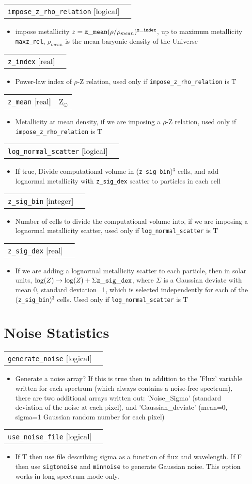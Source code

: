 \documentclass{report}
\makeatletter
\newcommand{\paramdefinition}[3]{
\begin{tabular*}{\textwidth}{l@{\extracolsep{\fill}}r}
		{\tt #1} [{\sc #2}]& #3 \\
\end{tabular*}}
\newcommand{\paramdescription}[1]{
\begin{itemize}
\item #1
\end{itemize}\vspace{0.2cm}}
\makeatother
\begin{document}
\paramdefinition{impose\_z\_rho\_relation}{logical}{ }
\paramdescription{ impose metallicity $z = {\tt z\_mean} (\rho/\rho_{mean})^{{\tt z\_index}}$, up to maximum metallicity {\tt maxz\_rel}, $\rho_{mean}$ is the mean baryonic density of the Universe}

\paramdefinition{z\_index}{real}{ }
\paramdescription{Power-law index of $\rho$-Z relation, used only if {\tt impose\_z\_rho\_relation} is T}

\paramdefinition{z\_mean}{real}{Z$_{\odot}$}
\paramdescription{Metallicity at mean density, if we are imposing a $\rho$-Z relation, used only if {\tt impose\_z\_rho\_relation} is T}

\paramdefinition{log\_normal\_scatter}{logical}{ }
\paramdescription{If true, Divide computational volume in ({\tt z\_sig\_bin})$^3$ cells, and add lognormal metallicity with {\tt z\_sig\_dex} scatter to particles in each cell}

\paramdefinition{z\_sig\_bin}{integer}{}
\paramdescription{Number of cells to divide the computational volume into, if we are imposing a lognormal metallicity scatter, used only if {\tt log\_normal\_scatter} is T}

\paramdefinition{z\_sig\_dex}{real}{}
\paramdescription{If we are adding a lognormal metallicity scatter to each particle, then in solar units, $\log(Z) \rightarrow \log(Z)+\Sigma {\tt z\_sig\_dex}$, where $\Sigma$ is a Gaussian deviate with mean 0, standard deviation=1, which is selected independently for each of the ({\tt z\_sig\_bin})$^3$ cells. Used only if {\tt log\_normal\_scatter} is T}

\section{Noise Statistics}
\paramdefinition{generate\_noise}{logical}{}
\paramdescription{Generate a noise array?  If this is true then in addition to the 'Flux' variable written for each spectrum (which always contains a noise-free spectrum), there are two additional arrays written out: 'Noise\_Sigma' (standard deviation of the noise at each pixel), and 'Gaussian\_deviate' (mean=0, sigma=1 Gaussian random number for each pixel)}

\paramdefinition{use\_noise\_file}{logical}{}
\paramdescription{If T then use file describing sigma as a function of flux and wavelength.  If F then use {\tt sigtonoise} and {\tt minnoise} to generate Gaussian noise.  This option works in long spectrum mode only.}
\end{document}
